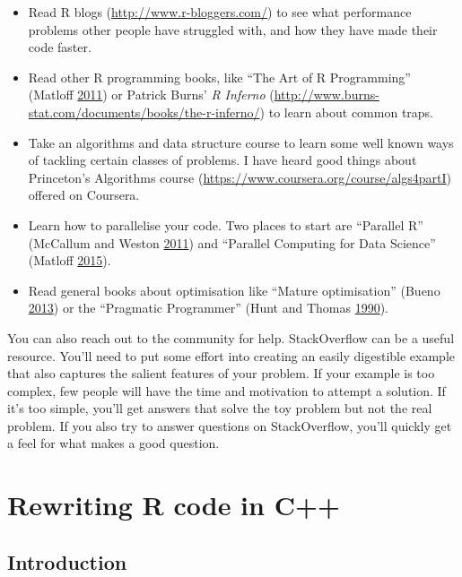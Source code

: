 \documentclass[]{book}
\renewcommand{\href}[2]{#2 (\url{#1})}
\begin{document}
\begin{itemize}
\item
  \href{http://www.r-bloggers.com/}{Read R blogs} to see what performance
  problems other people have struggled with, and how they have made their
  code faster.
\item
  Read other R programming books, like ``The Art of R Programming''
  (Matloff \protect\hyperlink{ref-art-r-prog}{2011}) or Patrick Burns'
  \href{http://www.burns-stat.com/documents/books/the-r-inferno/}{\emph{R Inferno}} to
  learn about common traps.
\item
  Take an algorithms and data structure course to learn some
  well known ways of tackling certain classes of problems. I have heard
  good things about Princeton's
  \href{https://www.coursera.org/course/algs4partI}{Algorithms course} offered on
  Coursera.
\item
  Learn how to parallelise your code. Two places to start are
  ``Parallel R'' (McCallum and Weston \protect\hyperlink{ref-parallel-r}{2011}) and ``Parallel Computing for Data Science''
  (Matloff \protect\hyperlink{ref-parcomp-ds}{2015}).
\item
  Read general books about optimisation like ``Mature optimisation'' (Bueno \protect\hyperlink{ref-mature-opt}{2013})
  or the ``Pragmatic Programmer'' (Hunt and Thomas \protect\hyperlink{ref-pragprog}{1990}).
\end{itemize}

You can also reach out to the community for help. StackOverflow can be a useful resource. You'll need to put some effort into creating an easily digestible example that also captures the salient features of your problem. If your example is too complex, few people will have the time and motivation to attempt a solution. If it's too simple, you'll get answers that solve the toy problem but not the real problem. If you also try to answer questions on StackOverflow, you'll quickly get a feel for what makes a good question.

\hypertarget{rcpp}{%
\chapter{Rewriting R code in C++}\label{rcpp}}

\hypertarget{introduction-10}{%
\section{Introduction}\label{introduction-10}}
\end{document}
